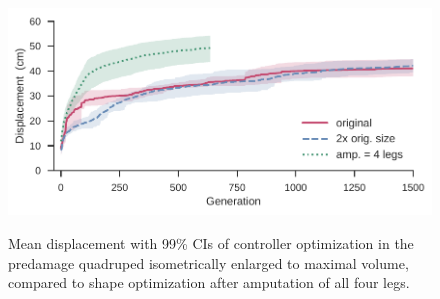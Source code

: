 

\begin{figure}
\begin{center}
\includegraphics[trim={5pt 0 0 0},clip,width=0.7\linewidth]{Chapter05/fig/RSS_Size_Effect.pdf}\\
\vspace{-6pt}
\caption{Mean displacement with 99\% CIs of controller optimization in the predamage quadruped isometrically enlarged to maximal volume, compared to shape optimization after amputation of all four legs.
}
\label{fig:size_effect}
\vspace{-2em}
\end{center}
\end{figure}

